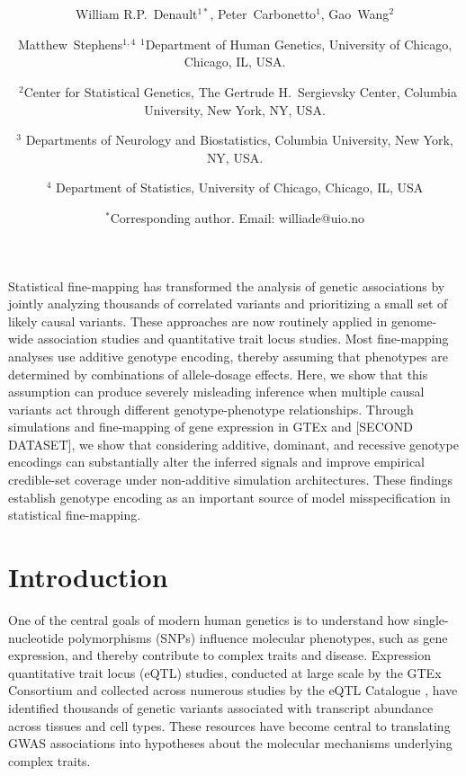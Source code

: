 \documentclass[12pt]{article}
\date{}
\title{\bfseries \boldmath \scititle}
\author{
	William R.P.~Denault$^{1\ast }$, Peter~Carbonetto$^{1 }$, Gao~Wang$ ^{2 }$ \and 
	 Matthew~Stephens$^{1,4}$ 
	\small$^{1}$Department of Human Genetics, University of Chicago, Chicago, IL, USA.\and\
	\small$^{2}$Center for Statistical Genetics, The Gertrude H.~Sergievsky Center, Columbia University, New York, NY, USA.\and
    \small$^{3}$ Departments of Neurology and Biostatistics, Columbia University, New York, NY, USA.\and
        \small$^{4}$ Department of Statistics, University of Chicago, Chicago, IL, USA\and
	\small$^\ast$Corresponding author. Email: williade@uio.no 
}
\renewenvironment{abstract}
	{\quotation}
	{\endquotation}
\begin{document}
 

\maketitle

\begin{abstract} \bfseries \boldmath
 

 Statistical fine-mapping has transformed the analysis of genetic associations by jointly analyzing thousands of correlated variants and prioritizing a small set of likely causal variants. These approaches are now routinely applied in genome-wide association studies and quantitative trait locus studies. Most fine-mapping analyses use additive genotype encoding, thereby assuming that phenotypes are determined by combinations of allele-dosage effects. Here, we show that this assumption can produce severely misleading inference when multiple causal variants act through different genotype-phenotype relationships. Through simulations and fine-mapping of gene expression in GTEx and [SECOND DATASET], we show that considering additive, dominant, and recessive genotype encodings can substantially alter the inferred signals and improve empirical credible-set coverage under non-additive simulation architectures. These findings establish genotype encoding as an important source of model misspecification in statistical fine-mapping.

\end{abstract}
\section{Introduction}
One of the central goals of modern human genetics is to understand how
single-nucleotide polymorphisms (SNPs) influence molecular phenotypes,
such as gene expression, and thereby contribute to complex traits and
disease. Expression quantitative trait locus (eQTL) studies, conducted
at large scale by the GTEx Consortium \cite{gtex_consortium_gtex_2020} and collected
across numerous studies by the eQTL Catalogue \cite{kerimov_compendium_2021}, have
identified thousands of genetic variants associated with transcript
abundance across tissues and cell types. These resources have become
central to translating GWAS associations into hypotheses about the
molecular mechanisms underlying complex traits.
\end{document}
